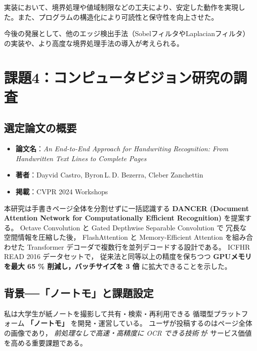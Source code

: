 \documentclass[a4paper,12pt]{jsarticle}
\begin{document}
実装において、境界処理や値域制限などの工夫により、安定した動作を実現した。また、プログラムの構造化により可読性と保守性を向上させた。

今後の発展として、他のエッジ検出手法（SobelフィルタやLaplacianフィルタ）の実装や、より高度な境界処理手法の導入が考えられる。

\section{課題4：コンピュータビジョン研究の調査}

\subsection{選定論文の概要}
\begin{itemize}
  \item \textbf{論文名}：\emph{An End-to-End Approach for Handwriting Recognition: From Handwritten Text Lines to Complete Pages}
  \item \textbf{著者}：Dayvid Castro, Byron\,L.\,D. Bezerra, Cleber Zanchettin
  \item \textbf{掲載}：CVPR 2024 Workshops
\end{itemize}

本研究は手書きページ全体を分割せずに一括認識する
\textbf{DANCER (Document Attention Network for Computationally Efficient Recognition)} を提案する。
Octave Convolution と Gated Depth\-wise Separable Convolution で
冗長な空間情報を圧縮した後，
Flash\-Attention と Memory-Efficient Attention を組み合わせた
Transformer デコーダで複数行を並列デコードする設計である。
ICFHR READ 2016 データセットで，
従来法と同等以上の精度を保ちつつ
\textbf{GPUメモリを最大 65 \% 削減し，バッチサイズを 3 倍} に拡大できることを示した。


\subsection{背景──「ノートモ」と課題設定}
私は大学生が紙ノートを撮影して共有・検索・再利用できる
循環型プラットフォーム \textbf{「ノートモ」} を開発・運営している。
ユーザが投稿するのはページ全体の画像であり，
\emph{前処理なしで高速・高精度に OCR できる技術} が
サービス価値を高める重要課題である。

\end{document}
